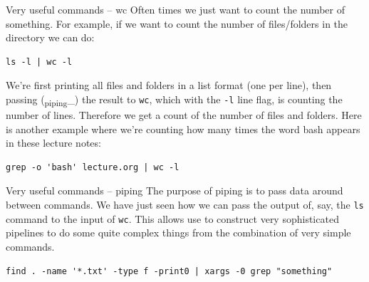 \documentclass[10pt]{beamer}
\begin{document}
\begin{frame}[label={sec:org19ca5c9},fragile]{Very useful commands -- wc}
 Often times we just want to count the number of something. For example, if we
want to count the number of files/folders in the directory we can do:

\begin{verbatim}
ls -l | wc -l
\end{verbatim}

We're first printing all files and folders in a list format (one per line), then
passing (\textsubscript{piping}\_) the result to \texttt{wc}, which with the \texttt{-l} line flag, is counting the
number of lines. Therefore we get a count of the number of files and
folders. Here is another example where we're counting how many times the word
bash appears in these lecture notes:

\begin{verbatim}
grep -o 'bash' lecture.org | wc -l
\end{verbatim}
\end{frame}

\begin{frame}[label={sec:org3a7cf03},fragile]{Very useful commands -- piping}
 The purpose of piping is to pass data around between commands. We have just seen
how we can pass the output of, say, the \texttt{ls} command to  the input of \texttt{wc}. This
allows use to construct very sophisticated pipelines to do some quite complex
things from the combination of very simple commands.

\begin{verbatim}
find . -name '*.txt' -type f -print0 | xargs -0 grep "something"
\end{verbatim}
\end{frame}
\end{document}

